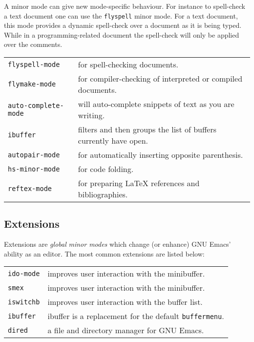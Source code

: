 \documentclass[12pt,a4paper,oneside]{article}
\begin{document}
A minor mode can give new mode-specific behaviour. For instance to spell-check a text document one can use the \texttt{flyspell} minor mode. For a text document, this mode provides a dynamic spell-check over a document as it is being typed. While in a programming-related document the spell-check will only be applied over the comments.\\

\begin{multicols}
  \begin{tabular}{@{}ll@{}}
  \texttt{flyspell-mode} & for spell-checking documents.\\
  \texttt{flymake-mode} & for compiler-checking of interpreted or compiled documents.\\
  \texttt{auto-complete-mode} & will auto-complete snippets of text as you are writing.\\
  \texttt{ibuffer} & filters and then groups the list of buffers currently have open.\\
  \texttt{autopair-mode} & for automatically inserting opposite parenthesis.\\
  \texttt{hs-minor-mode} & for code folding.\\
  \texttt{reftex-mode} & for preparing {\LaTeX} references and bibliographies.
  \end{tabular}
\end{multicols}

\subsection{Extensions}
Extensions are \emph{global} \emph{minor modes} which change (or enhance) GNU Emacs' ability as an editor. The most common extensions are listed below:\\

\begin{multicols}
  \begin{tabular}{@{}ll@{}}
    \texttt{ido-mode} & improves user interaction with the minibuffer.\\
    \texttt{smex} & improves user interaction with the minibuffer.\\
    \texttt{iswitchb} & improves user interaction with the buffer list.\\
    \texttt{ibuffer} & ibuffer is a replacement for the default \texttt{buffermenu}.\\
    \texttt{dired} & a file and directory manager for GNU Emacs.
  \end{tabular}
\end{multicols}
\end{document}
